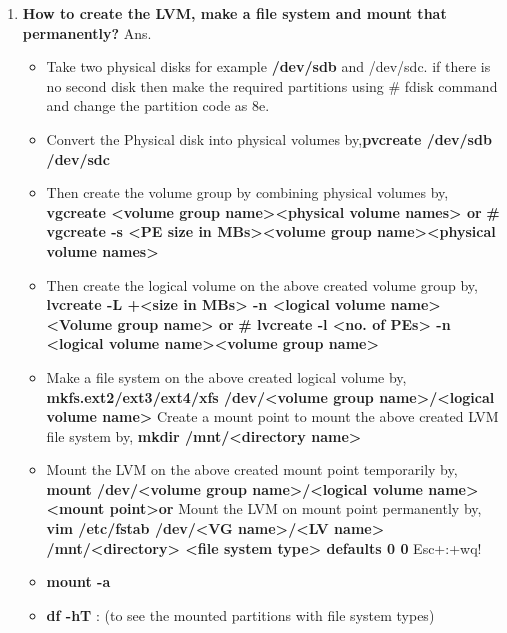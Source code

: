 \begin{enumerate}
\begin{enumerate}
  \bigskip
  \bigskip

  \item \textbf{How to create the LVM, make a file system and mount that permanently?}
  \newline
   Ans. \begin{itemize}
            \item Take two physical disks for example  \textbf{/dev/sdb }  and    /dev/sdc. if there is no second disk then make the 			required partitions using  # fdisk command and change the partition code as 8e.
            \item Convert the Physical disk into physical volumes by,\textbf{pvcreate   /dev/sdb    /dev/sdc}
            \item Then create the volume group by combining physical volumes by,
              \textbf{vgcreate  <volume group name><physical volume names>   or}
              \textbf{# vgcreate   -s  <PE size in MBs><volume group name><physical volume names>}
            \item Then create the logical volume on the above created volume group by,
               \textbf{lvcreate   -L  +<size in MBs>   -n  <logical volume name><Volume group name>  or}
               \textbf{# lvcreate   -l   <no. of PEs>    -n   <logical volume name><volume group name>}
            \item  Make a file system on the above created logical volume by,  
              \textbf{mkfs.ext2/ext3/ext4/xfs    /dev/<volume group name>/<logical volume name>}
              Create a mount point to mount the above created LVM file system by,
               \textbf{mkdir   /mnt/<directory name>}
            \item Mount the LVM on the above created mount point temporarily by,
            \textbf{mount   /dev/<volume group name>/<logical volume name><mount point>or}
            Mount the LVM on mount point permanently by,
             \textbf{vim  /etc/fstab
	          /dev/<VG name>/<LV name>	/mnt/<directory>	<file system type>	defaults	0	0}
            Esc+:+wq!
            \item \textbf{mount   -a}
            \item \textbf {df   -hT } :  (to see the mounted partitions with file system types)
        \end{itemize}
    
    \bigskip
    \bigskip


\end{enumerate}
\end{enumerate}
